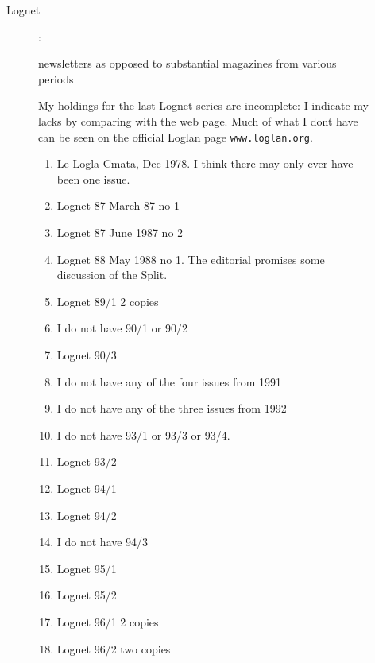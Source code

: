 \documentclass[12pt]{article}
\begin{document}
\begin{description}
\begin{description}
\begin{description}
\begin{enumerate}
\end{enumerate}

\end{description}

\item [Lognet]:

newsletters as opposed to substantial magazines from various periods

My holdings for the last Lognet series are incomplete:  I indicate my lacks by comparing with the web page.  Much of what I dont have can be seen on the official Loglan page {\tt www.loglan.org}.

\begin{enumerate}
\item  Le Logla Cmata, Dec 1978.  I think there may only ever have been one issue.
\item Lognet 87 March 87 no 1

\item Lognet 87 June 1987 no 2

\item Lognet 88 May 1988 no 1.  The editorial promises some discussion of the Split.

\item Lognet 89/1 2 copies

\item I do not have 90/1 or 90/2

\item Lognet 90/3

\item I do not have any of the four issues from 1991

\item  I do not have any of the three issues from 1992

\item I do not have 93/1 or 93/3 or 93/4.

\item Lognet 93/2

\item Lognet 94/1

\item Lognet 94/2

\item I do not have 94/3

\item Lognet 95/1
\item Lognet 95/2

\item Lognet 96/1 2 copies

\item Lognet 96/2 two copies


\end{enumerate}
\end{description}
\end{description}
\end{document}
